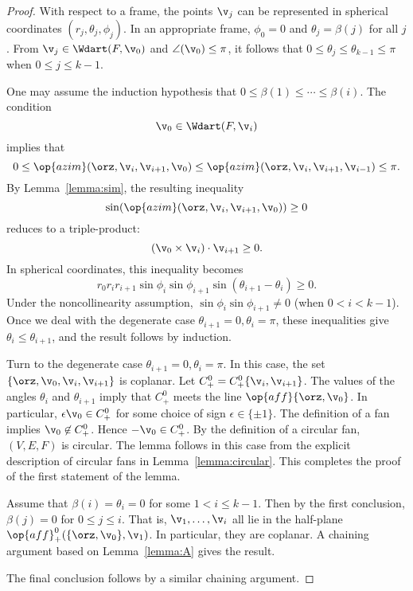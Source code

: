 \figQTICQYN %

\begin{proof}  
  With respect to a frame, the points $\v_j$ can be represented in
  spherical coordinates $(r_j,\theta_j,\phi_j)$.  In an appropriate
  frame, $\phi_0=0$ and $\theta_j=\beta(j)$ for all $j$.  From
  $\v_j\in \Wdart(F,\v_0)$ and $\angle(\v_0)\le\pi$, it follows that
  $0\le\theta_j\le\theta_{k-1}\le\pi$ when $0\le j\le k-1$.

One may assume the induction hypothesis that $0\le \beta(1)\le\cdots\le
\beta(i)$.  The condition
\[ 
\v_0\in \Wdart(F,\v_i)
\] 
implies that
\[ 
  0 \le \op{azim}(\orz,\v_i,\v_{i+1},\v_0)
\le \op{azim}(\orz,\v_i,\v_{i+1},\v_{i-1})\le\pi.
\] 
By Lemma~\ref{lemma:sim}, the resulting inequality
\[ 
\sin(\op{azim}(\orz,\v_i,\v_{i+1},\v_0))\ge 0
\] 
reduces to a triple-product:
\[ 
(\v_0 \times \v_i)\cdot \v_{i+1}\ge 0.
\] 
In spherical coordinates, this inequality becomes
\begin{equation}\label{eqn:triple-product}
r_0r_ir_{i+1}\sin\phi_i\sin\phi_{i+1}\sin(\theta_{i+1}-\theta_i)\ge0.
\end{equation}
Under the noncollinearity assumption, $\sin\phi_i\sin\phi_{i+1}\ne0$
(when $0< i < k-1$).  Once we deal with the degenerate
case $\theta_{i+1}=0,\theta_i=\pi$, these inequalities give
$\theta_i\le \theta_{i+1}$, and the result follows by induction.

Turn to the degenerate case $\theta_{i+1}=0,\theta_i=\pi$.  In this
case, the set $\{\orz,\v_0,\v_i,\v_{i+1}\}$ is coplanar.  Let
$C^0_+=C^0_+\{\v_i,\v_{i+1}\}$.  The values of the angles $\theta_i$ and
$\theta_{i+1}$ imply that $C^0_+$ meets the line
$\op{aff}\{\orz,\v_0\}$. In particular, $\epsilon \v_0\in C^0_+$ for
some choice of sign $\epsilon\in\{\pm 1\}$.  The definition of a fan
implies $\v_0\not\in C^0_+$. Hence $-\v_0\in C^0_+$.  By the
definition of a circular fan, $(V,E,F)$ is circular.  The lemma
follows in this case from the explicit description of circular fans in
Lemma~\ref{lemma:circular}.  This completes the proof of the first
statement of the lemma.

Assume that $\beta(i)=\theta_i=0$ for some $1<i\le k-1$.  Then by the first
conclusion, $\beta(j)=0$ for $0\le j\le i$.  That is, 
$\v_1,\ldots,\v_i$ all lie in the half-plane
$\op{aff}^0_+(\{\orz,\v_0\},\v_1)$.  In particular, they are coplanar.
A chaining argument based on Lemma~\ref{lemma:A} gives the result.

The final conclusion follows by a similar chaining argument.
\end{proof}


